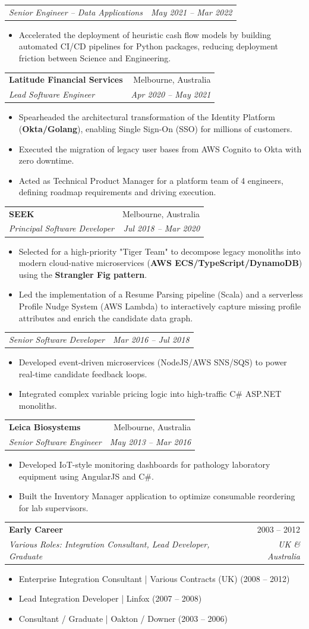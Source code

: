\documentclass[letterpaper,11pt]{article}
\makeatletter
\newcommand{\resumeItem}[1]{
  \item\small{
    {#1 \vspace{-2pt}}
  }
}
\newcommand{\resumeSubheading}[4]{
  \vspace{-1pt}\item
    \begin{tabular*}{0.97\textwidth}[t]{l@{\extracolsep{\fill}}r}
      \textbf{#1} & #2 \\
      \textit{\small#3} & \textit{\small #4} \\
    \end{tabular*}\vspace{-7pt}
}
\newcommand{\resumeSubSubheading}[2]{
    \item
    \begin{tabular*}{0.97\textwidth}{l@{\extracolsep{\fill}}r}
      \textit{\small#1} & \textit{\small #2} \\
    \end{tabular*}\vspace{-7pt}
}
\newcommand{\resumeItemListStart}{\begin{itemize}}
\newcommand{\resumeItemListEnd}{\end{itemize}\vspace{-5pt}}
\makeatother
\begin{document}
    \resumeSubSubheading
      {Senior Engineer -- Data Applications}{May 2021 -- Mar 2022}
      \resumeItemListStart
        \resumeItem{Accelerated the deployment of heuristic cash flow models by building automated CI/CD pipelines for Python packages, reducing deployment friction between Science and Engineering.}
      \resumeItemListEnd

    \resumeSubheading
      {Latitude Financial Services}{Melbourne, Australia}
      {Lead Software Engineer}{Apr 2020 -- May 2021}
      \resumeItemListStart
        \resumeItem{Spearheaded the architectural transformation of the Identity Platform (\textbf{Okta/Golang}), enabling Single Sign-On (SSO) for millions of customers.}
        \resumeItem{Executed the migration of legacy user bases from AWS Cognito to Okta with zero downtime.}
        \resumeItem{Acted as Technical Product Manager for a platform team of 4 engineers, defining roadmap requirements and driving execution.}
      \resumeItemListEnd

    \resumeSubheading
      {SEEK}{Melbourne, Australia}
      {Principal Software Developer}{Jul 2018 -- Mar 2020}
      \resumeItemListStart
        \resumeItem{Selected for a high-priority "Tiger Team" to decompose legacy monoliths into modern cloud-native microservices (\textbf{AWS ECS/TypeScript/DynamoDB}) using the \textbf{Strangler Fig pattern}.}
        \resumeItem{Led the implementation of a Resume Parsing pipeline (Scala) and a serverless Profile Nudge System (AWS Lambda) to interactively capture missing profile attributes and enrich the candidate data graph.}
      \resumeItemListEnd

    \resumeSubSubheading
      {Senior Software Developer}{Mar 2016 -- Jul 2018}
      \resumeItemListStart
        \resumeItem{Developed event-driven microservices (NodeJS/AWS SNS/SQS) to power real-time candidate feedback loops.}
        \resumeItem{Integrated complex variable pricing logic into high-traffic C\# ASP.NET monoliths.}
      \resumeItemListEnd

    \resumeSubheading
      {Leica Biosystems}{Melbourne, Australia}
      {Senior Software Engineer}{May 2013 -- Mar 2016}
      \resumeItemListStart
        \resumeItem{Developed IoT-style monitoring dashboards for pathology laboratory equipment using AngularJS and C\#.}
        \resumeItem{Built the Inventory Manager application to optimize consumable reordering for lab supervisors.}
      \resumeItemListEnd

    \resumeSubheading
      {Early Career}{2003 -- 2012}
      {Various Roles: Integration Consultant, Lead Developer, Graduate}{UK \& Australia}
      \resumeItemListStart
        \resumeItem{Enterprise Integration Consultant | Various Contracts (UK) (2008 -- 2012)}
        \resumeItem{Lead Integration Developer | Linfox (2007 -- 2008)}
        \resumeItem{Consultant / Graduate | Oakton / Downer (2003 -- 2006)}
      \resumeItemListEnd
\end{document}
